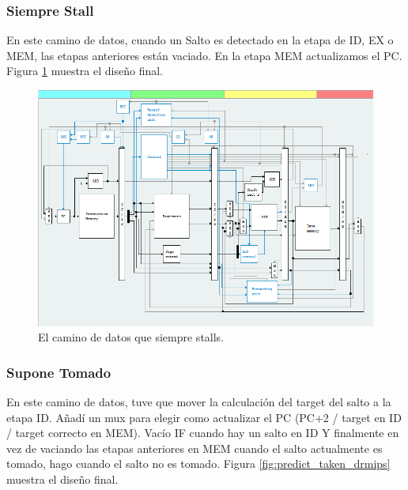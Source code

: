 \documentclass[a4paper]{article}
\begin{document}
\subsubsection{Siempre Stall}

En este camino de datos, cuando un Salto es detectado en la etapa de ID, EX o MEM, las etapas anteriores están vaciado. En la etapa MEM actualizamos el PC. Figura \ref{fig:always_stall_drmips} muestra el diseño final.

\begin{figure}[!htb]
\centering
\includegraphics[scale=0.4]{./img/always_stall_drmips}
\caption{El camino de datos que siempre stalls.}
\label{fig:always_stall_drmips}
\end{figure}

\subsubsection{Supone Tomado}

En este camino de datos, tuve que mover la calculación del target del salto a la etapa ID. Añadí un mux para elegir como actualizar el PC (PC+2 / target en ID / target correcto en MEM). Vacío IF cuando hay un salto en ID Y finalmente en vez de vaciando las etapas anteriores en MEM cuando el salto actualmente es tomado, hago cuando el salto no es tomado. Figura \ref{fig:predict_taken_drmips} muestra el diseño final.
\end{document}
